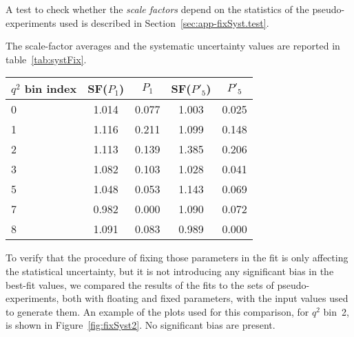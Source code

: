A test to check whether the \textit{scale factors} depend on the statistics of the pseudo-experiments used is described in Section~\ref{sec:app-fixSyst.test}.

The scale-factor averages and the systematic uncertainty values are reported in table~\ref{tab:systFix}.

\begin{table*}[!htb]
  \caption{Scale-factor average values and systematic uncertainties computed to compensate the statistical error reduction introduced fixing some PDF parameters\label{tab:systFix}}
  \begin{center}
    \begin{tabular}{l|cc|cc}
      $q^2$ bin index & SF($P_1$)  & $P_1$  & SF($P'_5$) & $P'_5$ \\
      \hline
      0 & 1.014 & 0.077 & 1.003 & 0.025  \\
      1 & 1.116 & 0.211 & 1.099 & 0.148  \\
      2 & 1.113 & 0.139 & 1.385 & 0.206  \\
      3 & 1.082 & 0.103 & 1.028 & 0.041  \\
      5 & 1.048 & 0.053 & 1.143 & 0.069  \\
      7 & 0.982 & 0.000 & 1.090 & 0.072  \\
      8 & 1.091 & 0.083 & 0.989 & 0.000  \\
    \end{tabular}
  \end{center}
\end{table*}

To verify that the procedure of fixing those parameters in the fit is only affecting the statistical uncertainty, but it is not introducing any significant bias in the best-fit values, we compared the results of the fits to the sets of pseudo-experiments, both with floating and fixed parameters, with the input values used to generate them.
An example of the plots used for this comparison, for $q^2$ bin~2, is shown in Figure~\ref{fig:fixSyst2}.
No significant bias are present.


